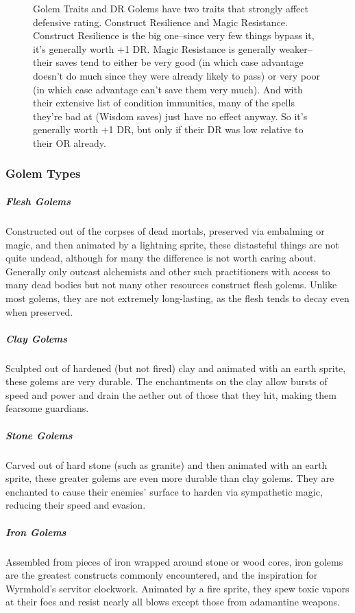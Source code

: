 \begin{figure}
	\begin{DndComment}{Golem Traits and DR}
		Golems have two traits that strongly affect defensive rating. Construct Resilience and Magic Resistance. Construct Resilience is the big one--since very few things bypass it, it's generally worth +1 DR. Magic Resistance is generally weaker--their saves tend to either be very good (in which case advantage doesn't do much since they were already likely to pass) or very poor (in which case advantage can't save them very much). And with their extensive list of condition immunities, many of the spells they're bad at (Wisdom saves) just have no effect anyway. So it's generally worth +1 DR, but only if their DR was low relative to their OR already.
	\end{DndComment}
\end{figure}

\subsubsection{Golem Types}
\subparagraph*{Flesh Golems} Constructed out of the corpses of dead mortals, preserved via embalming or magic, and then animated by a lightning sprite, these distasteful things are not quite undead, although for many the difference is not worth caring about. Generally only outcast alchemists and other such practitioners with access to many dead bodies but not many other resources construct flesh golems. Unlike most golems, they are not extremely long-lasting, as the flesh tends to decay even when preserved.
\subparagraph*{Clay Golems} Sculpted out of hardened (but not fired) clay and animated with an earth sprite, these golems are very durable. The enchantments on the clay allow bursts of speed and power and drain the aether out of those that they hit, making them fearsome guardians.
\subparagraph*{Stone Golems} Carved out of hard stone (such as granite) and then animated with an earth sprite, these greater golems are even more durable than clay golems. They are enchanted to cause their enemies' surface to harden via sympathetic magic, reducing their speed and evasion.
\subparagraph*{Iron Golems} Assembled from pieces of iron wrapped around stone or wood cores, iron golems are the greatest constructs commonly encountered, and the inspiration for Wyrmhold's servitor clockwork. Animated by a fire sprite, they spew toxic vapors at their foes and resist nearly all blows except those from adamantine weapons.

